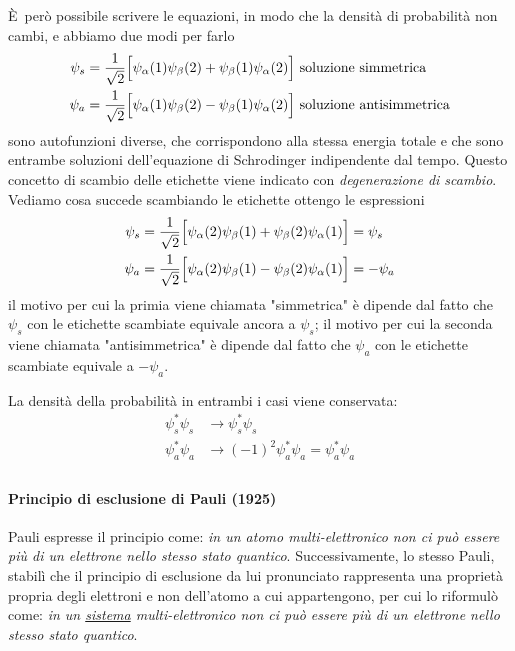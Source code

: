 È però possibile scrivere le equazioni, in modo che la densità di probabilità non cambi, e abbiamo due modi per farlo
\begin{equation}
\begin{split}
\psi_s & = \frac{1}{\sqrt{2}} \Bigl[ \psi_\alpha(1) \psi_\beta(2) + \psi_\beta(1) \psi_\alpha(2) \Bigr] \mbox{ soluzione simmetrica} \\
\psi_a & = \frac{1}{\sqrt{2}} \Bigl[ \psi_\alpha(1) \psi_\beta(2) - \psi_\beta(1) \psi_\alpha(2) \Bigr] \mbox{ soluzione antisimmetrica}
\end{split}
\label{funz_onda_sim_asim}
\end{equation}
sono autofunzioni diverse, che corrispondono alla stessa energia totale e che sono entrambe soluzioni dell'equazione di Schrodinger indipendente dal tempo.
Questo concetto di scambio delle etichette viene indicato con \textit{degenerazione di scambio}.
Vediamo cosa succede scambiando le etichette ottengo le espressioni
\begin{equation}
\begin{split}
\psi_s & = \frac{1}{\sqrt{2}} \Bigl[ \psi_\alpha(2) \psi_\beta(1) + \psi_\beta(2) \psi_\alpha(1) \Bigr] = \psi_s \\
\psi_a & = \frac{1}{\sqrt{2}} \Bigl[ \psi_\alpha(2) \psi_\beta(1) - \psi_\beta(2) \psi_\alpha(1) \Bigr] = - \psi_a
\end{split}
\end{equation}
il motivo per cui la primia viene chiamata "simmetrica" è dipende dal fatto che $\psi_s$ con le etichette scambiate equivale ancora a $\psi_s$;
il motivo per cui la seconda viene chiamata "antisimmetrica" è dipende dal fatto che $\psi_a$ con le etichette scambiate equivale a $-\psi_a$.

La densità della probabilità in entrambi i casi viene conservata:
\begin{equation}
\begin{split}
\psi^{\ast}_s\psi_s &\to \psi^{\ast}_s\psi_s \\
\psi^{\ast}_a\psi_a &\to (-1)^2 \psi^{\ast}_a\psi_a = \psi^{\ast}_a\psi_a\\
\end{split}
\end{equation}


\paragraph{Principio di esclusione di Pauli (1925)}
Pauli espresse il principio come: 
\textit{in un atomo multi-elettronico non ci può essere più di un elettrone nello stesso stato quantico}.
Successivamente, lo stesso Pauli, stabilì che il principio di esclusione da lui pronunciato rappresenta una proprietà propria degli elettroni e non dell'atomo a cui appartengono, per cui lo riformulò come: 
\textit{in un \underline{sistema} multi-elettronico non ci può essere più di un elettrone nello stesso stato quantico}.

